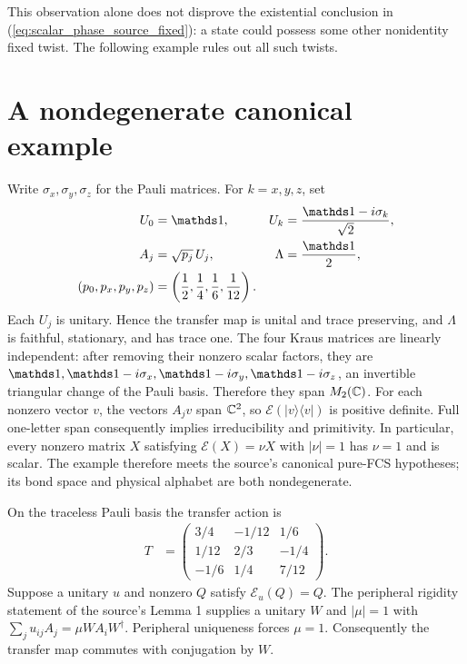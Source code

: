 \documentclass[11pt]{article}
\begin{document}
This observation alone does not disprove the existential conclusion in
(\ref{eq:scalar_phase_source_fixed}): a state could possess some other
nonidentity fixed twist. The following example rules out all such twists.

\section{A nondegenerate canonical example}

Write $\sigma_x,\sigma_y,\sigma_z$ for the Pauli matrices. For
$k=x,y,z$, set
\begin{align}
 U_0&=\Id,
 &U_k&=\frac{\Id-i\sigma_k}{\sqrt2},
 \label{eq:scalar_phase_tensor}\\
 A_j&=\sqrt{p_j}\,U_j,
 &\Lambda&=\frac{\Id}{2},
 \notag\\
 (p_0,p_x,p_y,p_z)&=\left(\frac12,\frac14,\frac16,\frac1{12}\right).
 \notag
\end{align}
Each $U_j$ is unitary. Hence the transfer map is unital and trace
preserving, and $\Lambda$ is faithful, stationary, and has trace one.
The four Kraus matrices are linearly independent: after removing their
nonzero scalar factors, they are
$\Id,\Id-i\sigma_x,\Id-i\sigma_y,\Id-i\sigma_z$, an invertible triangular
change of the Pauli basis. Therefore they span $M_2(\mathbb{C})$. For each nonzero
vector $v$, the vectors $A_jv$ span $\mathbb{C}^2$, so
$\mathcal E(|v\rangle\langle v|)$ is positive definite. Full one-letter
span consequently implies irreducibility and primitivity. In particular, every nonzero
matrix $X$ satisfying
$\mathcal E(X)=\nu X$ with $|\nu|=1$ has $\nu=1$ and is scalar.
The example therefore meets the source's canonical pure-FCS hypotheses;
its bond space and physical alphabet are both nondegenerate.

On the traceless Pauli basis the transfer action is
\begin{align}
 T&=\begin{pmatrix}
 3/4&-1/12&1/6\\
 1/12&2/3&-1/4\\
 -1/6&1/4&7/12
 \end{pmatrix}.
 \label{eq:scalar_phase_bloch}
\end{align}
Suppose a unitary $u$ and nonzero $Q$ satisfy $\mathcal E_u(Q)=Q$.
The peripheral rigidity statement of the source's Lemma 1 supplies a
unitary $W$ and $|\mu|=1$ with
$\sum_j u_{ij}A_j=\mu W A_iW^\dagger$.
Peripheral uniqueness forces $\mu=1$. Consequently the transfer map
commutes with conjugation by $W$.
\end{document}
